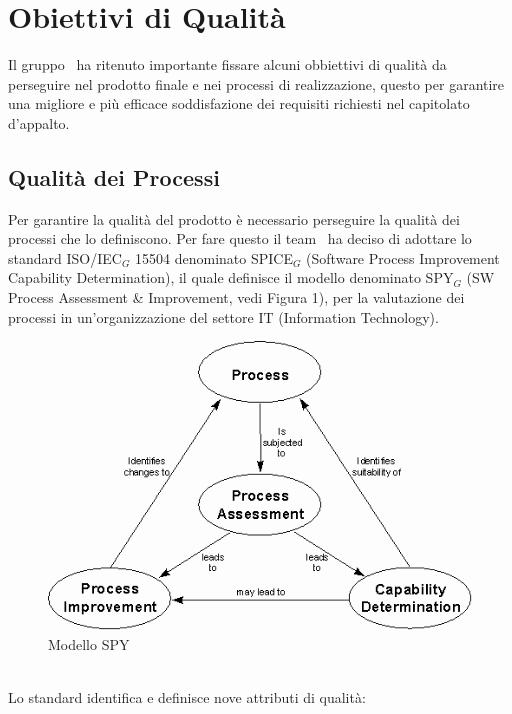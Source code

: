 \section{Obiettivi di Qualità}
Il gruppo \gruppo\ ha ritenuto importante fissare alcuni obbiettivi di qualità da perseguire nel prodotto finale e nei processi di realizzazione, questo per garantire una migliore e più efficace soddisfazione dei requisiti richiesti nel capitolato d'appalto.
\subsection{Qualità dei Processi}

Per garantire la qualità del prodotto è necessario perseguire la qualità dei processi che lo definiscono. Per fare questo il team \gruppo\ ha deciso di adottare lo standard ISO/IEC$_G$ 15504 denominato SPICE$_G$ (Software Process Improvement Capability Determination), il quale definisce il modello denominato SPY$_G$ (SW Process Assessment \& Improvement, vedi Figura 1), per la valutazione dei processi in un'organizzazione del settore IT (Information Technology).\\
\begin{figure}[h!]
		\centering
		\includegraphics[scale=.6]{img/Spy.png}
		\caption{Modello SPY}
		\label{fig:ModelloSpy}
\end{figure}
\\Lo standard identifica e definisce nove attributi di qualità:
\smallskip
